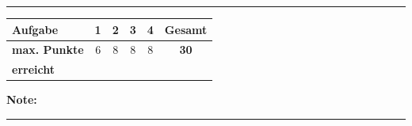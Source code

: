 \documentclass[11pt, a4paper]{article}
\newcommand{\luecke}[1]{\rule{#1}{0.4pt}}
\begin{document}
\vspace{25pt}
\hrule
\vspace{10pt}

\noindent
\begin{tabularx}{\textwidth}{|X|c|c|c|c||c|}
\hline
\textbf{Aufgabe} & 1 & 2 & 3 & 4 & \textbf{Gesamt} \\
\hline
\textbf{max. Punkte} & 6 & 8 & 8 & 8 & \textbf{30} \\
\hline
\textbf{erreicht} & & & & & \\[0.8em]
\hline
\end{tabularx}

\vspace{10pt}

\begin{flushright}
\textbf{Note:} \luecke{2cm}
\end{flushright}
\end{document}
